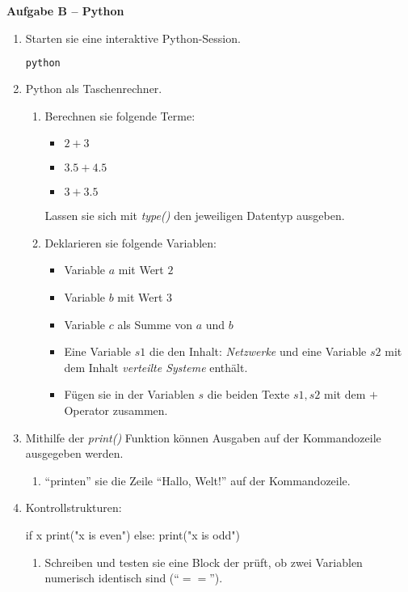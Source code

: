 \documentclass[paper=a4,fontsize=11pt]{scrartcl}%
\numberwithin{equation}{section}
\begin{document}
\begin{center}\Large{\textbf{Aufgabe B -- Python}}\end{center}\vskip0.25in
\begin{enumerate}
	\item Starten sie eine interaktive Python-Session.
	\begin{lstlisting}[style=Bash, language=Bash]
python
\end{lstlisting}
	\item Python als Taschenrechner.
	\begin{enumerate}
	\item Berechnen sie folgende Terme:
		\begin{itemize}
			\item $2 + 3$
			\item $3.5 + 4.5$
			\item $3 + 3.5$
		\end{itemize}
		Lassen sie sich mit \emph{type()} den jeweiligen Datentyp ausgeben.
		\item Deklarieren sie folgende Variablen:
		\begin{itemize}
			\item Variable $a$ mit Wert $2$
			\item Variable $b$ mit Wert $3$
			\item Variable $c$ als Summe von $a$ und $b$
			\item Eine Variable $s1$ die den Inhalt: \emph{Netzwerke} und eine Variable $s2$ mit dem Inhalt \emph{verteilte Systeme} enthält.
			\item Fügen sie in der Variablen $s$ die beiden Texte $s1, s2$ mit dem $+$ Operator zusammen.
		\end{itemize}
	\end{enumerate}
	\item Mithilfe der \emph{print()} Funktion können Ausgaben auf der Kommandozeile ausgegeben werden.
	\begin{enumerate}
		\item \enquote{printen} sie die Zeile \enquote{Hallo, Welt!} auf der Kommandozeile.
	\end{enumerate}
	\item Kontrollstrukturen:
	\begin{python}
if x %
	print("x is even")
else:
	print("x is odd")
\end{python}
	\begin{enumerate}
		\item Schreiben und testen sie eine Block der prüft, ob zwei Variablen numerisch identisch sind (\enquote{$==$}). 

\end{enumerate}
\end{enumerate}
\end{document}
